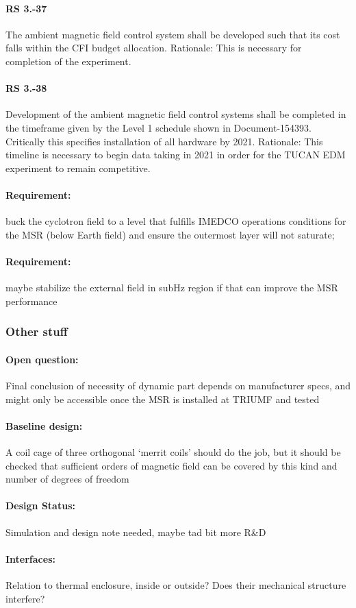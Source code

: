 \paragraph*{RS 3.-37}	The ambient magnetic field control system shall be developed such that its cost falls within the CFI budget allocation.
\newline Rationale: 	 This is necessary for completion of the experiment.
\paragraph*{RS 3.-38}	Development of the ambient magnetic field control systems shall be completed in the timeframe given by the Level 1 schedule shown in Document-154393. Critically this specifies installation of all hardware by 2021.
\newline Rationale: 	This timeline is necessary to begin data taking in 2021 in order for the TUCAN EDM experiment to remain competitive.

\paragraph*{Requirement:} buck the cyclotron field to a level that fulfills IMEDCO operations conditions
for the MSR (below Earth field) and ensure the outermost layer will not saturate;
\paragraph*{Requirement:}
maybe stabilize the external field in subHz region if that can improve the MSR performance

\subsubsection{Other stuff}

\paragraph*{Open question:} Final conclusion of necessity of dynamic part depends on manufacturer specs, and might
only be accessible once the MSR is installed at TRIUMF and tested

\paragraph*{Baseline design:} A coil cage of three orthogonal ‘merrit coils’ should do the job, but it should be checked that
sufficient orders of magnetic field can be covered by this kind and number of degrees of
freedom
\paragraph*{Design Status:} Simulation and design note needed, maybe tad bit more
R\&D
\paragraph*{Interfaces:} Relation to thermal enclosure, inside or outside? Does their mechanical structure interfere?





